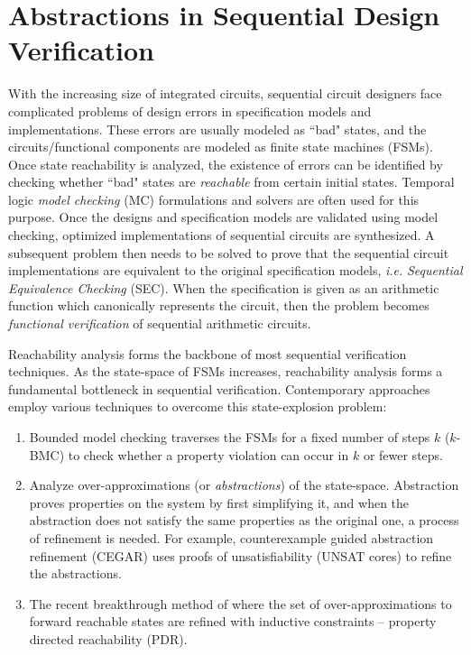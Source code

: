 \section{Abstractions in Sequential Design Verification}
With the increasing size of integrated
circuits, sequential circuit designers face complicated problems of
design errors in specification models and implementations. These
errors are usually modeled as ``bad" states, and the
circuits/functional components are modeled as finite state machines
(FSMs). Once state reachability is analyzed, the existence of errors
can be identified by checking whether ``bad" states are {\it
  reachable} from certain initial states. Temporal logic {\it model
  checking} (MC) formulations and solvers are often used for this
purpose. Once the designs and specification models are validated using
model checking, optimized implementations of sequential circuits are
synthesized. A subsequent problem then needs to be solved to prove
that the sequential circuit implementations are equivalent to the
original specification models, {\it i.e.} {\it Sequential Equivalence
  Checking }(SEC). When the specification is given as an arithmetic function
which canonically represents the circuit, then the problem 
becomes {\it functional verification} of sequential arithmetic circuits.

Reachability analysis forms the backbone of most sequential
verification techniques. As the state-space of FSMs increases,
reachability analysis forms a fundamental bottleneck in sequential
verification. Contemporary approaches employ various techniques to
overcome this state-explosion problem: 

\begin{enumerate}[{1)}]
\item Bounded model checking
\cite{bitlevel1} traverses the FSMs for a fixed number of steps $k$
($k$-BMC) to check whether a property violation can occur in $k$ or
fewer steps.  
\item Analyze over-approximations (or {\it abstractions})
of the state-space. Abstraction proves properties on the system by
first simplifying it, and when the abstraction does not satisfy the
same properties as the original one, a process of refinement is
needed. For example, counterexample guided
abstraction refinement (CEGAR) \cite{cegar-journal} uses proofs of
unsatisfiability (UNSAT cores) to refine the abstractions.
\item The recent breakthrough method of \cite{bradley2011sat} where the set of
over-approximations to forward reachable states are refined with
inductive constraints -- property directed reachability (PDR). 
\end{enumerate}


